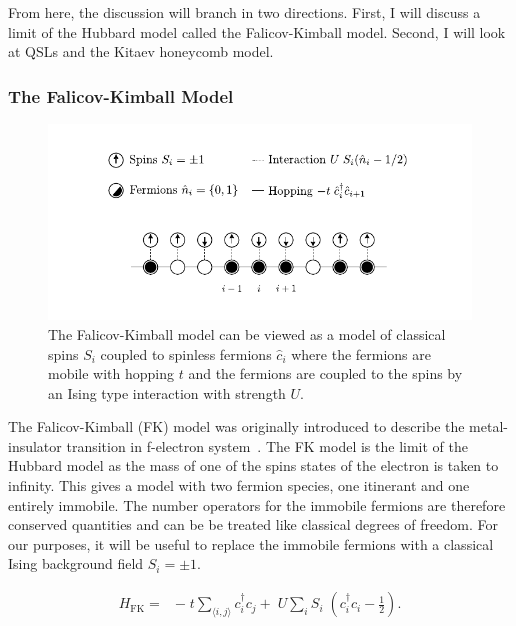 From here, the discussion will branch in two directions. First, I will discuss a limit of the Hubbard model called the Falicov-Kimball model. Second, I will look at QSLs and the Kitaev honeycomb model.

\hypertarget{intro-the-fk-model}{%
\subsubsection{The Falicov-Kimball Model}\label{intro-the-fk-model}}

\hypertarget{fig:fk_schematic}{%
\begin{figure}
\centering
\includegraphics[width=1\textwidth,height=\textheight]{figure_code/intro_chapter/fk_schematic}
\caption[{Falicov-Kimball Model Diagram}]{The Falicov-Kimball model can be viewed as a model of classical spins \(S_i\) coupled to spinless fermions \(\hat{c}_i\) where the fermions are mobile with hopping \(t\) and the fermions are coupled to the spins by an Ising type interaction with strength \(U\).}
\label{fig:fk_schematic}
\end{figure}
}

The Falicov-Kimball (FK) model was originally introduced to describe the metal-insulator transition in f-electron system~\autocite{hubbardj.ElectronCorrelationsNarrow1963,falicovSimpleModelSemiconductorMetal1969}. The FK model is the limit of the Hubbard model as the mass of one of the spins states of the electron is taken to infinity. This gives a model with two fermion species, one itinerant and one entirely immobile. The number operators for the immobile fermions are therefore conserved quantities and can be be treated like classical degrees of freedom. For our purposes, it will be useful to replace the immobile fermions with a classical Ising background field \(S_i = \pm1\).

\[\begin{aligned}
H_{\mathrm{FK}} = & -\;t \sum_{\langle i,j \rangle} c^\dagger_{i}c_{j} + \;U \sum_{i} S_i\;(c^\dagger_{i}c_{i} - \tfrac{1}{2}). \\ 
\end{aligned}\]

